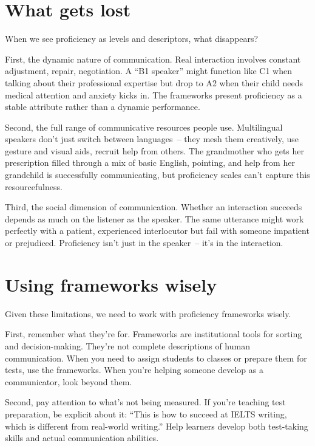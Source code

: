 \section{What gets lost}

When we see proficiency as levels and descriptors, what disappears?

First, the dynamic nature of communication. Real interaction involves constant adjustment, repair, negotiation. A ``B1 speaker'' might function like C1 when talking about their professional expertise but drop to A2 when their child needs medical attention and anxiety kicks in. The frameworks present proficiency as a stable attribute rather than a dynamic performance.

Second, the full range of communicative resources people use. Multilingual speakers don't just switch between languages~-- they mesh them creatively, use gesture and visual aids, recruit help from others. The grandmother who gets her prescription filled through a mix of basic English, pointing, and help from her grandchild is successfully communicating, but proficiency scales can't capture this resourcefulness.

Third, the social dimension of communication. Whether an interaction succeeds depends as much on the listener as the speaker. The same utterance might work perfectly with a patient, experienced interlocutor but fail with someone impatient or prejudiced. Proficiency isn't just in the speaker~-- it's in the interaction.

\section{Using frameworks wisely}

Given these limitations, we need to work with proficiency frameworks wisely.

First, remember what they're for. Frameworks are institutional tools for sorting and decision-making. They're not complete descriptions of human communication. When you need to assign students to classes or prepare them for tests, use the frameworks. When you're helping someone develop as a communicator, look beyond them.

Second, pay attention to what's not being measured. If you're teaching test preparation, be explicit about it: ``This is how to succeed at IELTS writing, which is different from real-world writing.'' Help learners develop both test-taking skills and actual communication abilities.

